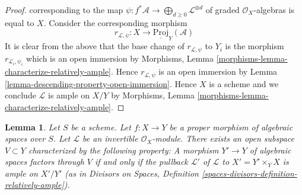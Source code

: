 \documentclass{stacks-project}
\theoremstyle{plain}
\newtheorem{lemma}[subsection]{Lemma}
\theoremstyle{definition}
\theoremstyle{remark}
\numberwithin{equation}{subsection}
\begin{document}
\begin{proof}
corresponding to the map
$\psi : f^*\mathcal{A} \to \bigoplus_{d \geq 0} \mathcal{L}^{\otimes d}$
of graded $\mathcal{O}_X$-algebras
is equal to $X$. Consider the corresponding morphism
$$
r_{\mathcal{L}, \psi} : X \longrightarrow \underline{\text{Proj}}_Y(\mathcal{A})
$$
It is clear from the above that the base change of
$r_{\mathcal{L}, \psi}$ to $Y_i$ is the morphism
$r_{\mathcal{L}_i, \psi_i}$ which is an open immersion by
Morphisms, Lemma \ref{morphisms-lemma-characterize-relatively-ample}.
Hence $r_{\mathcal{L}, \psi}$ is an open immersion
by Lemma \ref{lemma-descending-property-open-immersion}.
Hence $X$ is a scheme
and we conclude $\mathcal{L}$ is ample on $X/Y$ by
Morphisms, Lemma \ref{morphisms-lemma-characterize-relatively-ample}.
\end{proof}

\begin{lemma}
\label{lemma-ample-in-neighbourhood}
Let $S$ be a scheme.
Let $f : X \to Y$ be a proper morphism of algebraic spaces over $S$.
Let $\mathcal{L}$ be an invertible $\mathcal{O}_X$-module.
There exists an open subspace $V \subset Y$ characterized by
the following property:
A morphism $Y' \to Y$ of algebraic spaces factors
through $V$ if and only if the pullback $\mathcal{L}'$
of $\mathcal{L}$ to $X' = Y' \times_Y X$ is ample on $X'/Y'$
(as in Divisors on Spaces, Definition
\ref{spaces-divisors-definition-relatively-ample}).
\end{lemma}
\end{document}
